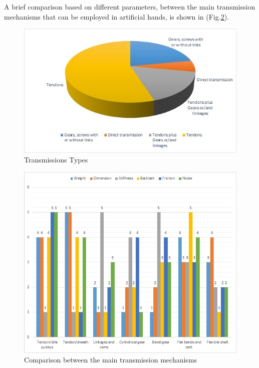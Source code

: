 \documentclass[a4paper, 10pt, conference]{ieeeconf}      %
\begin{document}
A brief comparison \cite{balasubramanian2014human} based on different parameters, between the main transmission mechanisms that can be employed in artificial hands, is shown in (Fig.\ref{fig:parameters}).\\
\begin{figure}[h!]
\centering  \includegraphics[width=1.0\linewidth]{./images/TransmissionsTypes}
  \caption{Transmissions Types}
  \label{fig:TransmissionsTypes}
	\end{figure}
\begin{figure}[h!]
\centering  \includegraphics[width=1.0\linewidth]{./images/parameters}
  \caption{Comparison between the main transmission mechanisms}
  \label{fig:parameters}
	\end{figure}
\end{document}
